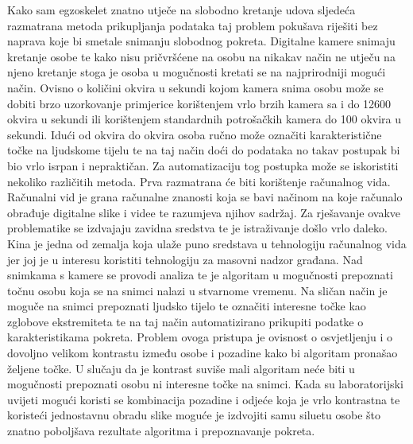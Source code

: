 \documentclass[times, utf8, diplomski]{fer}
\begin{document}
Kako sam egzoskelet znatno utječe na slobodno kretanje udova sljedeća razmatrana metoda prikupljanja podataka taj problem pokušava riješiti
bez naprava koje bi smetale snimanju slobodnog pokreta. Digitalne kamere snimaju kretanje osobe te kako nisu pričvršćene na osobu
na nikakav način ne utječu na njeno kretanje stoga je osoba u mogučnosti kretati se na najprirodniji mogući način. Ovisno o količini
okvira u sekundi kojom kamera snima osobu može se dobiti brzo uzorkovanje primjerice korištenjem vrlo brzih kamera sa i do
12600 okvira u sekundi ili korištenjem standardnih potrošačkih kamera do 100 okvira u sekundi. Idući od okvira do okvira osoba ručno
može označiti karakteristične točke na ljudskome tijelu te na taj način doći do podataka no takav postupak bi bio vrlo isrpan i
nepraktičan. Za automatizaciju tog postupka može se iskoristiti nekoliko različitih metoda. Prva razmatrana će biti korištenje
računalnog vida. Računalni vid je grana računalne znanosti koja se bavi načinom na koje računalo obrađuje digitalne slike i videe 
te razumjeva njihov sadržaj. Za rješavanje ovakve problematike se izdvajaju zavidna sredstva te je istraživanje došlo vrlo daleko.
Kina je jedna od zemalja koja ulaže puno sredstava u tehnologiju računalnog vida jer joj je u interesu koristiti tehnologiju za 
masovni nadzor građana. Nad snimkama s kamere se provodi analiza te je algoritam u mogučnosti prepoznati točnu osobu koja se na 
snimci nalazi u stvarnome vremenu. Na sličan način je moguče na snimci prepoznati ljudsko tijelo te označiti interesne točke kao zglobove ekstremiteta
te na taj način automatizirano prikupiti podatke o karakteristikama pokreta. Problem ovoga pristupa je ovisnost o osvjetljenju i o
dovoljno velikom kontrastu između osobe i pozadine kako bi algoritam pronašao željene točke. U slučaju da je kontrast suviše mali 
algoritam neće biti u mogučnosti prepoznati osobu ni interesne točke na snimci. Kada su laboratorijski uvijeti mogući koristi se
kombinacija pozadine i odjeće koja je vrlo kontrastna te koristeći jednostavnu obradu slike moguće je izdvojiti samu siluetu osobe
što znatno poboljšava rezultate algoritma i prepoznavanje pokreta.
\end{document}
